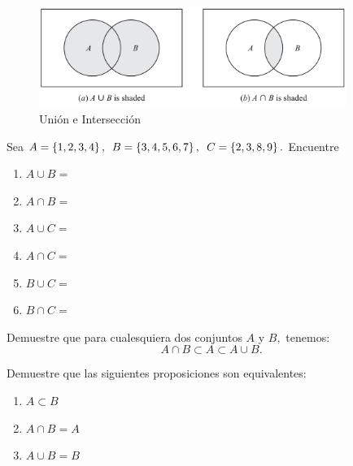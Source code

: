 	\begin{figure}
		\centering
		\includegraphics[width=10cm,keepaspectratio=true]{./md/venn_union_interseccion.png}
		\caption{Unión e Intersección}
		\label{fig:0103}
	\end{figure}
	




	\begin{problema}
		\label{lip:exmp:1.4.a}
		Sea $A=\left\{ 1,2,3,4 \right\},$ $B=\left\{ 3,4,5,6,7 \right\},$ $C=\left\{ 2,3,8,9 \right\}.$ Encuentre 
		\begin{enumerate}
			\item $A \cup B=$ 
			\item $A \cap B=$ 
			\item $A \cup C=$ 
			\item $A \cap C=$ 
			\item $B \cup C=$ 
			\item $B \cap C=$
		\end{enumerate}
		
	\end{problema}
	



	\begin{problema}
		\label{thm:1.3}
		Demuestre que para cualesquiera dos conjuntos $A$ y $B,$ tenemos:
		$$
		A \cap B \subset A \subset A \cup B.
		$$
	\end{problema}
	



	\begin{problema}
		\label{thm:1.4}
		Demuestre que las siguientes proposiciones son equivalentes:
		\begin{enumerate}
			\item $\displaystyle A \subset B$
			\item $\displaystyle A \cap B = A$
			\item $\displaystyle A \cup B = B$
		\end{enumerate}
		
	\end{problema}
	



